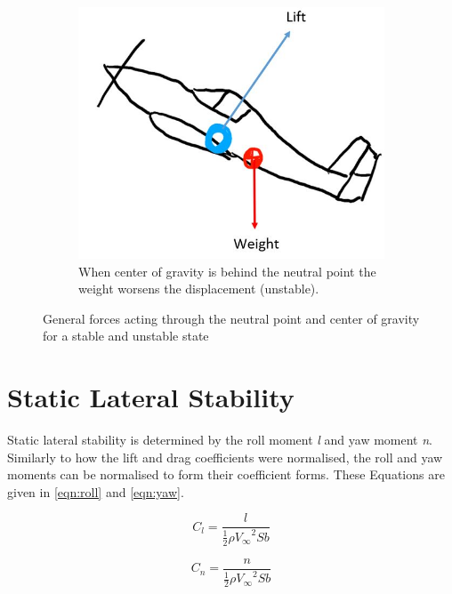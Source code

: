 \begin{figure}[H]
\begin{subfigure}[b]{0.45\textwidth}
         \includegraphics[width=\textwidth]{02_Background/Figs/b3.JPG}
         \caption{When center of gravity is behind the neutral point the weight worsens the displacement (unstable). }
         \label{fig:Pressa2b}
     \end{subfigure}
     \hfill
        \caption{General forces acting through the neutral point and center of gravity for a stable and unstable state}
    \label{fig:stable}
\end{figure}




\section{Static Lateral Stability}

Static lateral stability is determined by the roll moment \textit{l} and yaw moment \textit{n}. Similarly to how the lift and drag coefficients were normalised, the roll and yaw moments can be normalised to form their coefficient forms. These Equations are given in \ref{eqn:roll} and \ref{eqn:yaw}. 

\begin{equation}
    C_l = \frac{l}{\frac{1}{2} \rho {V_\infty}^2 S b }
    \label{eqn:roll}
\end{equation}

\begin{equation}
    C_n = \frac{n}{\frac{1}{2} \rho {V_\infty}^2 S b }
    \label{eqn:]yaw}
\end{equation}

